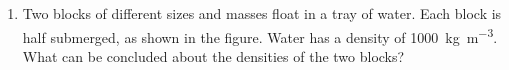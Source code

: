 \documentclass{../../../oss-apphys}
\begin{document}
\genheader


\genmultidirections

\gengravity

\raggedcolumns
\begin{multicols}{2}

  \begin{enumerate}[leftmargin=18pt]

  \item Two blocks of different sizes and masses float in a tray of water. Each
    block is half submerged, as shown in the figure. Water has a density of
    \SI{1000}{\kilo\gram\per\metre^3}. What can be concluded about the
    densities of the two blocks?
    
%
%    

\end{enumerate}
\end{multicols}
\end{document}
